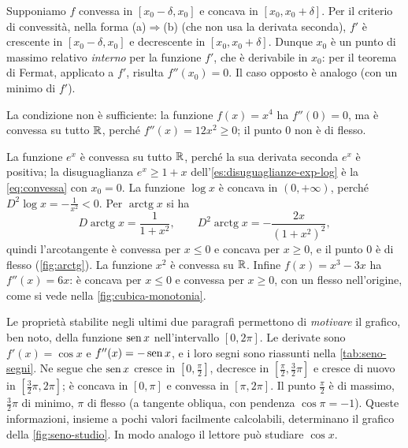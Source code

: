 \begin{dimostrazione}
Supponiamo $f$ convessa in $[x_{0}-\delta,x_{0}]$ e concava in $[x_{0},x_{0}+\delta]$.
Per il criterio di convessità, nella forma (a)$\Rightarrow$(b) (che non usa la derivata
seconda), $f'$ è crescente in $[x_{0}-\delta,x_{0}]$ e decrescente in
$[x_{0},x_{0}+\delta]$. Dunque $x_{0}$ è un punto di massimo relativo \emph{interno} per
la funzione $f'$, che è derivabile in $x_{0}$: per il teorema di Fermat, applicato a
$f'$, risulta $f''(x_{0})=0$. Il caso opposto è analogo (con un minimo di $f'$).
\end{dimostrazione}

La condizione non è sufficiente: la funzione $f(x)=x^{4}$ ha $f''(0)=0$, ma è convessa su
tutto $\mathbb{R}$, perché $f''(x)=12x^{2}\ge0$; il punto $0$ non è di flesso.

\begin{esempio}\label{es:convessita-elementari}
La funzione $e^{x}$ è convessa su tutto $\mathbb{R}$, perché la sua derivata seconda $e^{x}$ è
positiva; la disuguaglianza $e^{x}\ge1+x$ dell'\cref{es:disuguaglianze-exp-log} è la
\eqref{eq:convessa} con $x_{0}=0$. La funzione $\log x$ è concava in $(0,+\infty)$,
perché $D^{2}\log x=-\frac1{x^{2}}<0$. Per $\operatorname{arctg}x$ si ha
\[
  D\operatorname{arctg}x=\frac1{1+x^{2}}, \qquad
  D^{2}\operatorname{arctg}x=-\frac{2x}{(1+x^{2})^{2}},
\]
quindi l'arcotangente è convessa per $x\le0$ e concava per $x\ge0$, e il punto $0$ è di
flesso (\cref{fig:arctg}). La funzione $x^{2}$ è convessa su $\mathbb{R}$. Infine
$f(x)=x^{3}-3x$ ha $f''(x)=6x$: è concava per $x\le0$ e convessa per $x\ge0$, con un
flesso nell'origine, come si vede nella \cref{fig:cubica-monotonia}.
\end{esempio}

\begin{esempio}\label{es:grafico-seno}
Le proprietà stabilite negli ultimi due paragrafi permettono di \emph{motivare} il
grafico, ben noto, della funzione $\operatorname{sen} x$ nell'intervallo $[0,2\pi]$. Le derivate sono
$f'(x)=\cos x$ e $f''(x)=-\operatorname{sen} x$, e i loro segni sono riassunti nella
\cref{tab:seno-segni}. Ne segue che $\operatorname{sen} x$ cresce in $[0,\frac\pi2]$, decresce in
$[\frac\pi2,\frac32\pi]$ e cresce di nuovo in $[\frac32\pi,2\pi]$; è concava in
$[0,\pi]$ e convessa in $[\pi,2\pi]$. Il punto $\frac\pi2$ è di massimo, $\frac32\pi$ di
minimo, $\pi$ di flesso (a tangente obliqua, con pendenza $\cos\pi=-1$). Queste
informazioni, insieme a pochi valori facilmente calcolabili, determinano il grafico
della \cref{fig:seno-studio}. In modo analogo il lettore può studiare $\cos x$.
\end{esempio}

